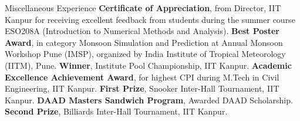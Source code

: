 \begin{rubric}{Miscellaneous Experience}
\entry*[2016] \textbf{Certificate of Appreciation}, from Director, IIT Kanpur for receiving excellent feedback from students during the summer course ESO208A (Introduction to Numerical Methods and Analysis).
\entry*[2015] \textbf{Best Poster Award}, in category Monsoon Simulation and Prediction at Annual Monsoon Workshop Pune (IMSP), organized by India Institute of Tropical Meteorology (IITM), Pune.
\entry*[2014, 2015, 2016] \textbf{Winner}, Institute Pool Championship, IIT Kanpur.
\entry*[2012] \textbf{Academic Excellence Achievement Award}, for highest CPI during M.Tech in Civil Engineering, IIT Kanpur.
\entry*[2011] \textbf{First Prize}, Snooker Inter-Hall Tournament, IIT Kanpur.
\entry*[2011] \textbf{DAAD Masters Sandwich Program}, Awarded DAAD Scholarship.
\entry*[2010] \textbf{Second Prize}, Billiards Inter-Hall Tournament, IIT Kanpur.


\end{rubric}
